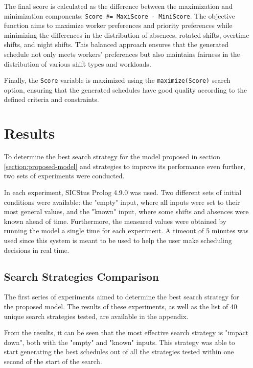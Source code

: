 \documentclass[conference]{IEEEtran}
\begin{document}
The final score is calculated as the difference between the maximization and minimization components: \texttt{Score \#= MaxiScore - MiniScore}. The objective function aims to maximize worker preferences and priority preferences while minimizing the differences in the distribution of absences, rotated shifts, overtime shifts, and night shifts. This balanced approach ensures that the generated schedule not only meets workers' preferences but also maintains fairness in the distribution of various shift types and workloads.

Finally, the \texttt{Score} variable is maximized using the  \texttt{maximize(Score)} search option, ensuring that the generated schedules have good quality according to the defined criteria and constraints.

\section{Results}
\label{section:results}

To determine the best search strategy for the model proposed in section \ref{section:proposed-model} and strategies to improve its performance even further, two sets of experiments were conducted.

In each experiment, SICStus Prolog 4.9.0 was used. Two different sets of initial conditions were available: the "empty" input, where all inputs were set to their most general values, and the "known" input, where some shifts and absences were known ahead of time. Furthermore, the measured values were obtained by running the model a single time for each experiment. A timeout of 5 minutes was used since this system is meant to be used to help the user make scheduling decisions in real time.

\subsection{Search Strategies Comparison}

The first series of experiments aimed to determine the best search strategy for the proposed model. The results of these experiments, as well as the list of 40 unique search strategies tested, are available in the appendix.

From the results, it can be seen that the most effective search strategy is "impact down", both with the "empty" and "known" inputs. This strategy was able to start generating the best schedules out of all the strategies tested within one second of the start of the search.
\end{document}
